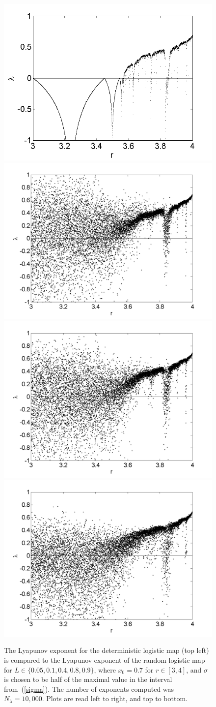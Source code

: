 \begin{figure}[!h]
\caption[Lyapunov exponent in the random logistic map compared to the
deterministic map, $\sigma=\frac{1}{2}\sigma_{max}$]{The Lyapunov exponent for the deterministic
  logistic map (top left) is compared
  to the Lyapunov exponent of the random logistic map for $L \in
  \{0.05,0.1,0.4,0.8,0.9\}$, where $x_0=0.7$ for $r \in [3,4]$, and
  $\sigma$ is chosen to be half of the maximal value in the interval
  from~(\ref{sigma}). The number of exponents computed was $N_\lambda=10,000$. Plots are read left to right, and top to bottom. }\label{fig:rloglyap2_hs}
\centering
\includegraphics[width=.5\textwidth]{figs/det_log_lyap.png}\hfill
\includegraphics[width=.5\textwidth]{figs/rlog_lyap_halfsig_L_005.png}\\
\includegraphics[width=.5\textwidth]{figs/rlog_lyap_halfsig_L_01.png}\hfill
\includegraphics[width=.5\textwidth]{figs/rlog_lyap_halfsig_L_04.png}\\

\end{figure}
